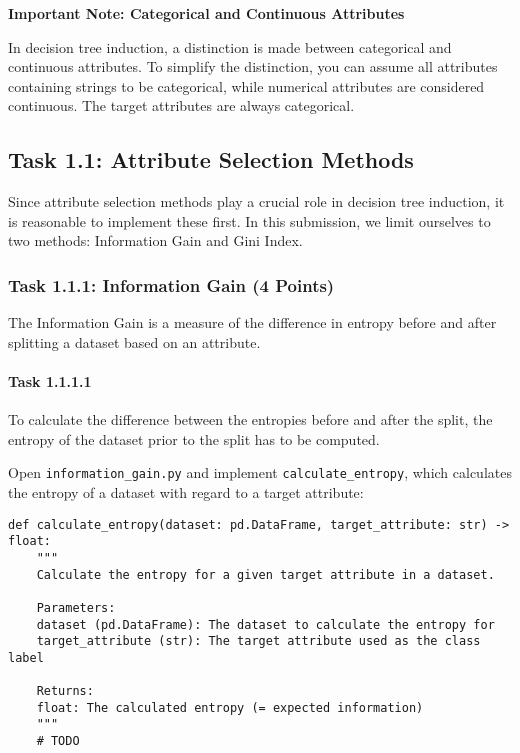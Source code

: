 \documentclass[
english,
smallborders
]{i6prcsht}
\newcommand{\points}[1]{\hfill \color{red}(#1 Points)\color{black}}
\begin{document}
\vspace*{1mm}

\begin{mdframed}
	\begin{em}
		\textbf{Important Note: Categorical and Continuous Attributes}
		
		In decision tree induction, a distinction is made between categorical and continuous attributes. To simplify the distinction, you can assume all attributes containing strings to be categorical, while numerical attributes are considered continuous. The target attributes are always categorical.
	\end{em}
\end{mdframed}

\subsection*{Task 1.1: Attribute Selection Methods}

Since attribute selection methods play a crucial role in decision tree induction, it is reasonable to implement these first. In this submission, we limit ourselves to two methods: Information Gain and Gini Index.

\subsubsection*{Task 1.1.1: Information Gain \points{4}}

The Information Gain is a measure of the difference in entropy before and after splitting a dataset based on an attribute.

\paragraph*{Task 1.1.1.1} \hfill

To calculate the difference between the entropies before and after the split, the entropy of the dataset prior to the split has to be computed.

Open \texttt{information\_gain.py} and implement \texttt{calculate\_entropy}, which calculates the entropy of a dataset with regard to a target attribute:

\vspace*{0.3cm}

\begin{lstlisting}
def calculate_entropy(dataset: pd.DataFrame, target_attribute: str) -> float:
	"""
	Calculate the entropy for a given target attribute in a dataset.

	Parameters:
	dataset (pd.DataFrame): The dataset to calculate the entropy for
	target_attribute (str): The target attribute used as the class label

	Returns:
	float: The calculated entropy (= expected information)
	"""
	# TODO
\end{lstlisting}
\end{document}
